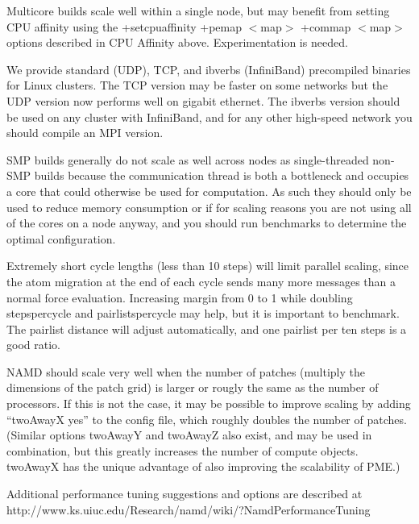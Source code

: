 Multicore builds scale well within a single node, but may benefit from
setting CPU affinity using the +setcpuaffinity +pemap $<$map$>$ +commap $<$map$>$
options described in CPU Affinity above.  Experimentation is needed.

We provide standard (UDP), TCP, and ibverbs (InfiniBand) precompiled
binaries for Linux clusters.  The TCP version may be faster on some
networks but the UDP version now performs well on gigabit ethernet.
The ibverbs version should be used on any cluster with InfiniBand,
and for any other high-speed network you should compile an MPI version.

SMP builds generally do not scale as well across nodes as single-threaded
non-SMP builds because the communication thread is both a bottleneck and
occupies a core that could otherwise be used for computation.  As such
they should only be used to reduce memory consumption or if for scaling
reasons you are not using all of the cores on a node anyway, and you
should run benchmarks to determine the optimal configuration.

Extremely short cycle lengths (less than 10 steps) will limit parallel
scaling, since the atom migration at the end of each cycle sends many
more messages than a normal force evaluation.  Increasing margin from
0 to 1 while doubling stepspercycle and pairlistspercycle may help,
but it is important to benchmark.  The pairlist distance will adjust
automatically, and one pairlist per ten steps is a good ratio.

NAMD should scale very well when the number of patches (multiply the
dimensions of the patch grid) is larger or rougly the same as the
number of processors.  If this is not the case, it may be possible
to improve scaling by adding ``twoAwayX yes'' to the config file,
which roughly doubles the number of patches.  (Similar options
twoAwayY and twoAwayZ also exist, and may be used in combination,
but this greatly increases the number of compute objects.  twoAwayX
has the unique advantage of also improving the scalability of PME.)
  

Additional performance tuning suggestions and options are described
at http://www.ks.uiuc.edu/Research/namd/wiki/?NamdPerformanceTuning

